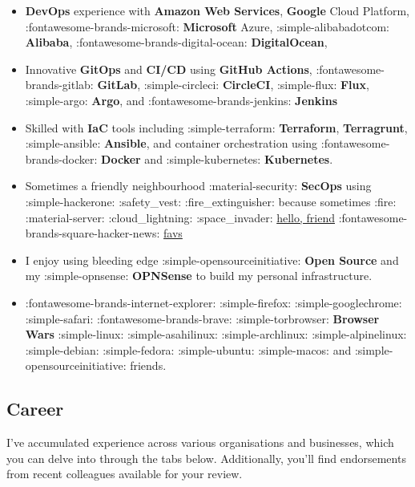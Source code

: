 \documentclass[
]{article}
\begin{document}
\begin{itemize}
\item
  \textbf{DevOps} experience with \faAmazon \textbf{Amazon Web
  Services}, \faGoogle \textbf{Google} Cloud Platform,
  :fontawesome-brands-microsoft: \textbf{Microsoft} Azure,
  :simple-alibabadotcom: \textbf{Alibaba},
  :fontawesome-brands-digital-ocean: \textbf{DigitalOcean},
\item
  Innovative \textbf{GitOps} and \textbf{CI/CD} using \faGithub
  \textbf{GitHub Actions}, :fontawesome-brands-gitlab: \textbf{GitLab},
  :simple-circleci: \textbf{CircleCI}, :simple-flux: \textbf{Flux},
  :simple-argo: \textbf{Argo}, and :fontawesome-brands-jenkins:
  \textbf{Jenkins}
\item
  Skilled with \textbf{IaC} tools including :simple-terraform:
  \textbf{Terraform}, \textbf{Terragrunt}, :simple-ansible:
  \textbf{Ansible}, and container orchestration using
  :fontawesome-brands-docker: \textbf{Docker} and :simple-kubernetes:
  \textbf{Kubernetes}.
\item
  Sometimes a friendly neighbourhood :material-security: \textbf{SecOps}
  using :simple-hackerone: :safety\_vest: :fire\_extinguisher: because
  sometimes :fire: :material-server: :cloud\_lightning: :space\_invader:
  \href{}{hello, friend} :fontawesome-brands-square-hacker-news:
  \href{https://news.ycombinator.com/favorites?id=danslinky}{favs}
\item
  I enjoy using bleeding edge :simple-opensourceinitiative: \textbf{Open
  Source} and my :simple-opnsense: \textbf{OPNSense} to build my
  personal infrastructure.
\item
  :fontawesome-brands-internet-explorer: :simple-firefox:
  :simple-googlechrome: :simple-safari: :fontawesome-brands-brave:
  :simple-torbrowser: \textbf{Browser Wars} :simple-linux:
  :simple-asahilinux: :simple-archlinux: :simple-alpinelinux:
  :simple-debian: :simple-fedora: :simple-ubuntu: :simple-macos: and
  :simple-opensourceinitiative: friends.
\end{itemize}

\hypertarget{career}{%
\subsection{Career}\label{career}}

I've accumulated experience across various organisations and businesses,
which you can delve into through the tabs below. Additionally, you'll
find endorsements from recent colleagues available for your review.
\end{document}
